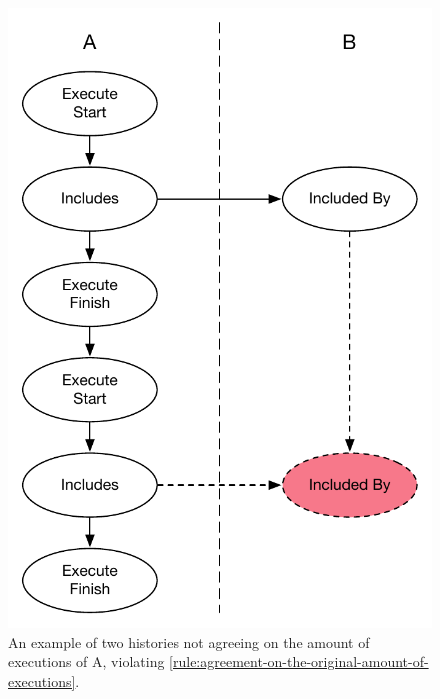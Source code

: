 	\begin{figure}[H]
		\centering
		\begin{minipage}{.45\textwidth}
			\includegraphics[width=\textwidth]{5validation/images/agreement-on-original-amount-of-executions-1.pdf}
			\caption{An example of two histories not agreeing on the amount of executions of A, violating \autoref{rule:agreement-on-the-original-amount-of-executions}.}
			\label{fig:agreement-on-the-original-amount-of-executions-1}
		\end{minipage}
		\hfill
		\begin{minipage}{.45\textwidth}

\end{minipage}
\end{figure}
